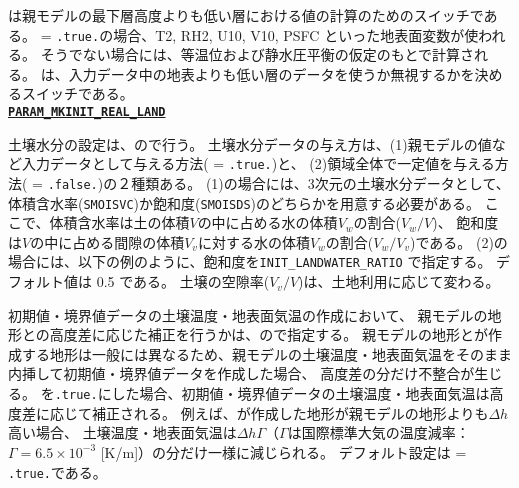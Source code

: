 は親モデルの最下層高度よりも低い層における値の計算のためのスイッチである。
 = \verb|.true.|の場合、T2, RH2, U10, V10, PSFC といった地表面変数が使われる。
そうでない場合には、等温位および静水圧平衡の仮定のもとで計算される。
は、入力データ中の地表よりも低い層のデータを使うか無視するかを決めるスイッチである。
\\

\noindent\textbf{\underline{\texttt{PARAM\_MKINIT\_REAL\_LAND}}}

土壌水分の設定は、ので行う。
土壌水分データの与え方は、(1)親モデルの値など入力データとして与える方法( = \verb|.true.|)と、
(2)領域全体で一定値を与える方法( = \verb|.false.|)の２種類ある。
(1)の場合には、3次元の土壌水分データとして、
体積含水率(\verb|SMOISVC|)か飽和度(\verb|SMOISDS|)のどちらかを用意する必要がある。
ここで、体積含水率は土の体積$V$の中に占める水の体積$V_w$の割合($V_w / V$)、
飽和度は$V$の中に占める間隙の体積$V_v$に対する水の体積$V_w$の割合($V_w / V_v$)である。
%
(2)の場合には、以下の例のように、飽和度を\verb|INIT_LANDWATER_RATIO| で指定する。
デフォルト値は 0.5 である。
土壌の空隙率($V_v/V$)は、土地利用に応じて変わる。

初期値・境界値データの土壌温度・地表面気温の作成において、
親モデルの地形との高度差に応じた補正を行うかは、ので指定する。
親モデルの地形と\scalerm が作成する地形は一般には異なるため、親モデルの土壌温度・地表面気温をそのまま内挿して初期値・境界値データを作成した場合、
高度差の分だけ不整合が生じる。
を\verb|.true.|にした場合、初期値・境界値データの土壌温度・地表面気温は高度差に応じて補正される。
例えば、\scalerm が作成した地形が親モデルの地形よりも$\Delta h$高い場合、
土壌温度・地表面気温は$\Delta h\Gamma$（$\Gamma$は国際標準大気の温度減率：$\Gamma=6.5\times 10^{-3}$ [K/m]）の分だけ一様に減じられる。
デフォルト設定は = \verb|.true.|である。


